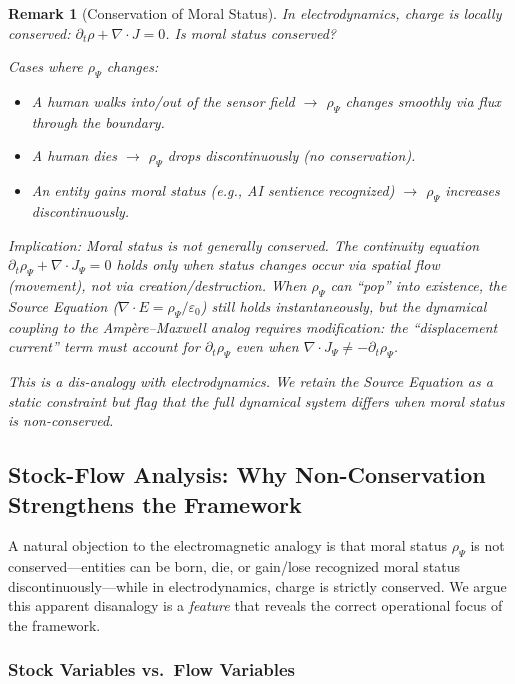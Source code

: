 \documentclass[12pt]{article}
\newtheorem{remark}[theorem]{Remark}
\begin{document}
\begin{remark}[Conservation of Moral Status]
\emph{In electrodynamics, charge is locally conserved: $\partial_t \rho +
\nabla \cdot J = 0$. Is moral status conserved?}

\emph{Cases where $\rho_\Psi$ changes:}
\begin{itemize}
\item \emph{A human walks into/out of the sensor field $\to$ $\rho_\Psi$ changes smoothly via flux through the
boundary.}
\item \emph{A human dies $\to$ $\rho_\Psi$ drops discontinuously (no conservation).}
\item \emph{An entity gains moral status (e.g., AI sentience recognized) $\to$ $\rho_\Psi$ increases discontinuously.}
\end{itemize}

\emph{Implication: Moral status is not generally conserved. The continuity equation $\partial_t \rho_\Psi + \nabla \cdot J_\Psi = 0$
holds only when status changes occur via spatial flow (movement), not via creation/destruction.
When $\rho_\Psi$ can ``pop'' into existence, the Source Equation ($\nabla \cdot E = \rho_\Psi / \varepsilon_0$) still holds instantaneously,
but the dynamical coupling to the Amp\`{e}re--Maxwell analog requires modification: the ``displacement
current'' term must account for $\partial_t \rho_\Psi$ even when $\nabla \cdot J_\Psi \neq -\partial_t \rho_\Psi$.}

\emph{This is a dis-analogy with electrodynamics. We retain the Source Equation as a static constraint
but flag that the full dynamical system differs when moral status is non-conserved.}
\end{remark}

\subsection{Stock-Flow Analysis: Why Non-Conservation Strengthens the Framework}

A natural objection to the electromagnetic analogy is that moral status $\rho_\Psi$ is not conserved---entities
can be born, die, or gain/lose recognized moral status discontinuously---while in electrodynamics,
charge is strictly conserved. We argue this apparent disanalogy is a \emph{feature} that reveals the correct
operational focus of the framework.

\subsubsection{Stock Variables vs.\ Flow Variables}
\end{document}

